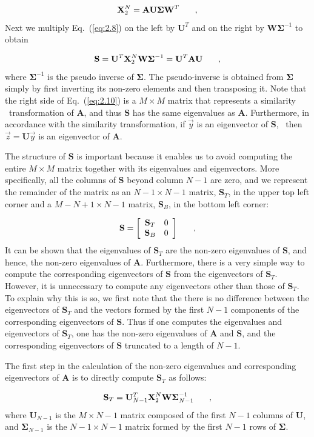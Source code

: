 \documentclass[12pt]{article}
\newcommand{\bracket}[1]{\left[ #1 \right]}
\renewcommand{\vec}[1]{\overrightarrow{#1}}
\newcommand{\be}{\begin{equation}}
\newcommand{\ee}{\end{equation}}
\newcommand{\pec}{\hspace{0.25in},}
\newcommand{\LEQ}[1]{\label{eq:#1}}
\newcommand{\EQ}[1]{Eq.~(\ref{eq:#1})}
\newcommand{\mA}{\mathbf{A}}
\newcommand{\mX}{\mathbf{X}}
\newcommand{\mU}{\mathbf{U}}
\newcommand{\mW}{\mathbf{W}}
\newcommand{\mSigma}{\mathbf{\Sigma}}
\newcommand{\mS}{\mathbf{S}}
\begin{document}
\be
	\mX_2^{N} = \mA \mU \mSigma \mW^T \pec
	\LEQ{2.8}
\ee
Next we multiply \EQ{2.8} on the left by $\mU^{T}$ and on the right by $\mW\mSigma^{-1}$ to obtain 

\be
	\mS = \mU^{T}\mX_2^{N}\mW\mSigma^{-1} = \mU^{T}\mA\mU \pec
	\LEQ{2.10}
\ee
where $\mSigma^{-1}$ is the pseudo inverse of $\mSigma$.
The pseudo-inverse is obtained from $\mSigma$ simply by first inverting its non-zero elements and 
	then transposing it. 
Note that the right side of \EQ{2.10} is a $M \times M$ matrix that represents a similarity \	
	transformation of $\mA$, and thus $\mS$ has the same eigenvalues as $\mA$.  
Furthermore, in accordance with the similarity transformation, if $\vec{y}$ is an eigenvector of $\mS$, \
	then $\vec{z} = \mU \vec{y}$ is an eigenvector of $\mA$.  

The structure of $\mS$ is important because it enables us to avoid computing the entire $M \times M$ matrix together with its eigenvalues and eigenvectors.
More specifically, all the columns of $\mS$ beyond column $N-1$ are zero, and we represent the 
	remainder of the matrix as an $N-1 \times N-1$ matrix, $\mS_{T}$, in the upper top left corner and a 
	$M-N+1 \times N-1$ matrix, $\mS_B$, in the bottom left corner:
 
\be
	\mS = \bracket{
	\begin{array}{cc}
		\mS_T  & 0 \\
		\mS_B & 0  
	\end{array}
	} \pec
	\LEQ{2.11}
\ee
It can be shown that the eigenvalues of $\mS_T$ are the non-zero eigenvalues of $\mS$, and hence, 
	the non-zero eigenvalues of $\mA$.  
Furthermore, there is a very simple way to compute the corresponding eigenvectors of $\mS$ from the 
	eigenvectors of $\mS_T$. 
However, it is unnecessary to compute any eigenvectors other than those of $\mS_T$.  
To explain why this is so, we first note that the there is no difference between the eigenvectors of 
	$\mS_T$ and the vectors formed by the first $N-1$ components of the corresponding eigenvectors 
	of $\mS$.  
Thus if one computes the eigenvalues and eigenvectors of $\mS_T$, one has the non-zero eigenvalues 
	of $\mA$ and $\mS$, and the corresponding eigenvectors of $\mS$ truncated to a length of $N-1$.

The first step in the calculation of the non-zero eigenvalues and corresponding eigenvectors of $\mA$ 
	is to directly compute $\mS_T$ as follows:

\be
	\mS_T = \mU_{N-1}^{T} \mX_{2}^{N}\mW\mSigma^{-1}_{N-1} \pec
	\LEQ{2.12}
\ee
where $\mU_{N-1}$ is the $M \times N-1$ matrix composed of the first $N-1$ columns of $\mU$, and 	
	$\mSigma_{N-1}$ is the $N-1 \times N-1$ matrix formed by the first $N-1$ rows of $\mSigma$.  
\end{document}
